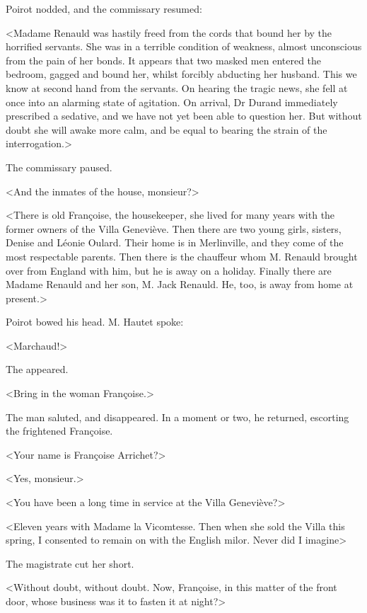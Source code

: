  Poirot nodded, and the commissary resumed: 

 <Madame Renauld was hastily freed from the cords that bound her by the horrified servants. She was in a terrible condition of weakness, almost unconscious from the pain of her bonds. It appears that two masked men entered the bedroom, gagged and bound her, whilst forcibly abducting her husband. This we know at second hand from the servants. On hearing the tragic news, she fell at once into an alarming state of agitation. On arrival, Dr Durand immediately prescribed a sedative, and we have not yet been able to question her. But without doubt she will awake more calm, and be equal to bearing the strain of the interrogation.> 

 The commissary paused. 

 <And the inmates of the house, monsieur?> 

 <There is old Françoise, the housekeeper, she lived for many years with the former owners of the Villa Geneviève. Then there are two young girls, sisters, Denise and Léonie Oulard. Their home is in Merlinville, and they come of the most respectable parents. Then there is the chauffeur whom M. Renauld brought over from England with him, but he is away on a holiday. Finally there are Madame Renauld and her son, M. Jack Renauld. He, too, is away from home at present.> 

 Poirot bowed his head. M. Hautet spoke: 

 <Marchaud!> 

 The  appeared. 

 <Bring in the woman Françoise.> 

 The man saluted, and disappeared. In a moment or two, he returned, escorting the frightened Françoise. 

 <Your name is Françoise Arrichet?> 
 

 <Yes, monsieur.> 

 <You have been a long time in service at the Villa Geneviève?> 

 <Eleven years with Madame la Vicomtesse. Then when she sold the Villa this spring, I consented to remain on with the English milor. Never did I imagine\longdash> 

 The magistrate cut her short. 

 <Without doubt, without doubt. Now, Françoise, in this matter of the front door, whose business was it to fasten it at night?> 

